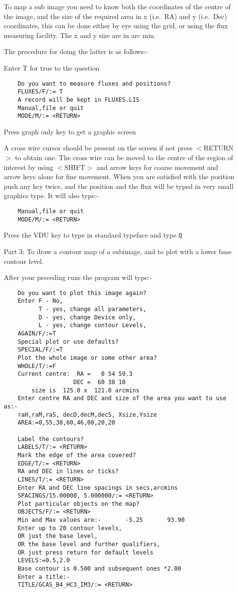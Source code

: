 \begin{itemize}
To map a sub image you need to know both the coordinates of the centre of the
image, and the size of the required area in x (i.e.\ RA) and y (i.e.\ Dec)
coordinates, this can be done either by eye using the grid, or using the flux
measuring facility. The x and y size are in arc min.


The procedure for doing the latter is as follows:-

Enter T for true to the question
\begin{verbatim}
    Do you want to measure fluxes and positions?
    FLUXES/F/:= T
    A record will be kept in FLUXES.LIS
    Manual,file or quit
    MODE/M/:= <RETURN>
\end{verbatim}
Press graph only key to get a graphic screen

A cross wire cursor should be present on the screen if not press $<$RETURN$>$ to
obtain one. The cross wire can be moved to the centre of the region of interest
by using $<$SHIFT$>$ and arrow keys for coarse movement and arrow keys alone for
fine movement. When you are satisfied with the position push any key twice, and
the position and the flux will be typed in very small graphics type. It will
also type:-
\begin{verbatim}
    Manual,file or quit
    MODE/M/:= <RETURN>
\end{verbatim}
Press the VDU key to type in standard typeface and type {\tt Q}

\pagebreak
\item [Part 3:] To draw a contour map of a subimage, and to plot with a lower
base contour level.

After your preceding runs the program will type:-

\begin{verbatim}
    Do you want to plot this image again?
    Enter F - No,
          T - yes, change all parameters,
          D - yes, change Device only,
          L - yes, change contour Levels,
    AGAIN/F/:=T
    Special plot or use defaults?
    SPECIAL/F/:=T
    Plot the whole image or some other area?
    WHOLE/T/:=F
    Current centre:  RA =   0 54 59.3
                    DEC =  60 38 10
        size is  125.0 x  121.0 arcmins
    Enter centre RA and DEC and size of the area you want to use as:-
    raH,raM,raS, decD,decM,decS, Xsize,Ysize
    AREA:=0,55,30,60,46,00,20,20

    Label the contours?
    LABELS/T/:= <RETURN>
    Mark the edge of the area covered?
    EDGE/T/:= <RETURN>
    RA and DEC in lines or ticks?
    LINES/T/:= <RETURN>
    Enter RA and DEC line spacings in secs,arcmins
    SPACINGS/15.00000, 5.000000/:= <RETURN>
    Plot particular objects on the map?
    OBJECTS/F/:= <RETURN>
    Min and Max values are:-       -5.25       93.90
    Enter up to 20 contour levels,
    OR just the base level,
    OR the base level and further qualifiers,
    OR just press return for default levels
    LEVELS:=0.5,2.0
    Base contour is 0.500 and subsequent ones *2.00
    Enter a title:-
    TITLE/GCAS_B4_HC3_IM3/:= <RETURN>
\end{verbatim}


\end{itemize}
